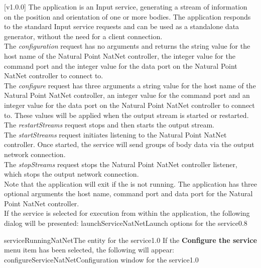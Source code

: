 [v1.0.0]
The  application is an Input service,
generating a stream of information on the position and orientation of one or more bodies.
The application responds to the standard Input service requests and can be used as a
standalone data generator, without the need for a client connection.\\

The \emph{configuration} request has no arguments and returns the string value for the
host name of the Natural Point NatNet controller, the integer value for the command port
and the integer value for the data port on the Natural Point NatNet controller to connect
to.\\

The \emph{configure} request has three arguments \longDash{} a string value for the host
name of the Natural Point NatNet controller, an integer value for the command port and an
integer value for the data port on the Natural Point NatNet controller to connect to.
These values will be applied when the output stream is started or restarted.\\ 

The \emph{restartStreams} request stops and then starts the output stream.\\

The \emph{startStreams} request initiates listening to the Natural Point NatNet
controller.
Once started, the service will send groups of body data via the output \yarp{} network
connection.\\

The \emph{stopStreams} request stops the Natural Point NatNet controller listener, which
stops the output \yarp{} network connection.\\ 

Note that the application will exit if the \emph{\RS} is not running.
The application has three optional arguments \longDash{} the host name, command port and
data port for the Natural Point NatNet controller.
\insertAppParameters
\insertTagDescription{\NNI}
\insertInputServiceComment\\

\insertStandardServiceCommands
\secondaryEnd
\condPage
{}
If the service is selected for execution from within the \emph{\MMMU} application, the
following dialog will be presented:
%
{launchServiceNatNet}{Launch options for the \emph{\NNI} service}{0.8}

%
{serviceRunningNatNet}{The \emph{\MMMU} entity for the \emph{\NNI} service}{1.0}
\condPage{}
If the \textbf{Configure the service} menu item has been selected, the following will
appear:
%
{configureServiceNatNet}{Configuration window for the \emph{\NNI} service}{1.0}
\secondaryEnd
\primaryEnd{}
